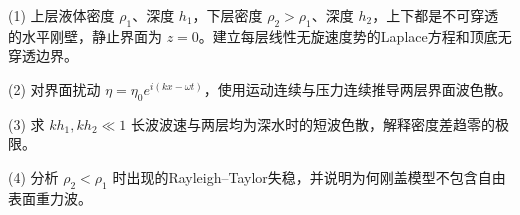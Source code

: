 (1) 上层液体密度 \(\rho_1\)、深度 \(h_1\)，下层密度 \(\rho_2>\rho_1\)、深度 \(h_2\)，上下都是不可穿透的水平刚壁，静止界面为 \(z=0\)。建立每层线性无旋速度势的Laplace方程和顶底无穿透边界。

(2) 对界面扰动 \(\eta=\eta_0e^{i(kx-\omega t)}\)，使用运动连续与压力连续推导两层界面波色散。

(3) 求 \(kh_1,kh_2\ll1\) 长波波速与两层均为深水时的短波色散，解释密度差趋零的极限。

(4) 分析 \(\rho_2<\rho_1\) 时出现的Rayleigh–Taylor失稳，并说明为何刚盖模型不包含自由表面重力波。

